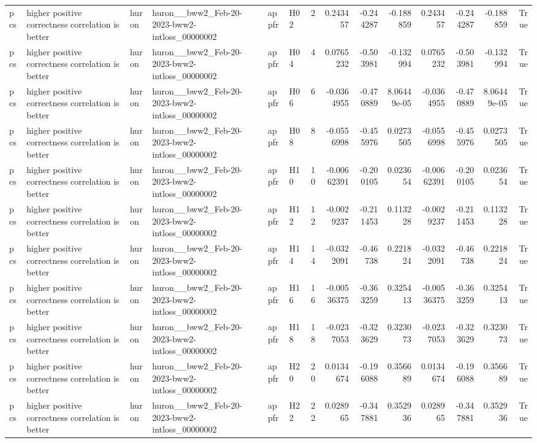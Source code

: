 \begin{longtable}{llllllrrrrrrrr}
pcs & higher positive correctness correlation is better & huron & huron\_\_bww2\_Feb-20-2023-bww2-intloss\_00000002 & appfr & H02 & 2 & 0.243457 & -0.244287 & -0.188859 & 0.243457 & -0.244287 & -0.188859 & True \\
pcs & higher positive correctness correlation is better & huron & huron\_\_bww2\_Feb-20-2023-bww2-intloss\_00000002 & appfr & H04 & 4 & 0.0765232 & -0.503981 & -0.132994 & 0.0765232 & -0.503981 & -0.132994 & True \\
pcs & higher positive correctness correlation is better & huron & huron\_\_bww2\_Feb-20-2023-bww2-intloss\_00000002 & appfr & H06 & 6 & -0.0364955 & -0.470889 & 8.06449e-05 & -0.0364955 & -0.470889 & 8.06449e-05 & True \\
pcs & higher positive correctness correlation is better & huron & huron\_\_bww2\_Feb-20-2023-bww2-intloss\_00000002 & appfr & H08 & 8 & -0.0556998 & -0.455976 & 0.0273505 & -0.0556998 & -0.455976 & 0.0273505 & True \\
pcs & higher positive correctness correlation is better & huron & huron\_\_bww2\_Feb-20-2023-bww2-intloss\_00000002 & appfr & H10 & 10 & -0.00662391 & -0.200105 & 0.023654 & -0.00662391 & -0.200105 & 0.023654 & True \\
pcs & higher positive correctness correlation is better & huron & huron\_\_bww2\_Feb-20-2023-bww2-intloss\_00000002 & appfr & H12 & 12 & -0.0029237 & -0.211453 & 0.113228 & -0.0029237 & -0.211453 & 0.113228 & True \\
pcs & higher positive correctness correlation is better & huron & huron\_\_bww2\_Feb-20-2023-bww2-intloss\_00000002 & appfr & H14 & 14 & -0.0322091 & -0.46738 & 0.221824 & -0.0322091 & -0.46738 & 0.221824 & True \\
pcs & higher positive correctness correlation is better & huron & huron\_\_bww2\_Feb-20-2023-bww2-intloss\_00000002 & appfr & H16 & 16 & -0.00536375 & -0.363259 & 0.325413 & -0.00536375 & -0.363259 & 0.325413 & True \\
pcs & higher positive correctness correlation is better & huron & huron\_\_bww2\_Feb-20-2023-bww2-intloss\_00000002 & appfr & H18 & 18 & -0.0237053 & -0.323629 & 0.323073 & -0.0237053 & -0.323629 & 0.323073 & True \\
pcs & higher positive correctness correlation is better & huron & huron\_\_bww2\_Feb-20-2023-bww2-intloss\_00000002 & appfr & H20 & 20 & 0.0134674 & -0.196088 & 0.356689 & 0.0134674 & -0.196088 & 0.356689 & True \\
pcs & higher positive correctness correlation is better & huron & huron\_\_bww2\_Feb-20-2023-bww2-intloss\_00000002 & appfr & H22 & 22 & 0.028965 & -0.347881 & 0.352936 & 0.028965 & -0.347881 & 0.352936 & True \\

\end{longtable}
